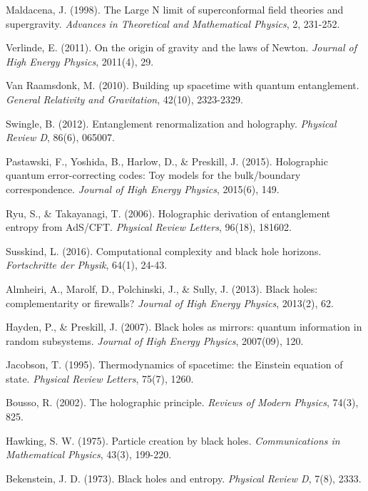 \documentclass[12pt,a4paper]{article}
\begin{document}
\begin{thebibliography}{99}

 Maldacena, J. (1998). The Large N limit of superconformal field theories and supergravity. \textit{Advances in Theoretical and Mathematical Physics}, 2, 231-252.

 Verlinde, E. (2011). On the origin of gravity and the laws of Newton. \textit{Journal of High Energy Physics}, 2011(4), 29.

 Van Raamsdonk, M. (2010). Building up spacetime with quantum entanglement. \textit{General Relativity and Gravitation}, 42(10), 2323-2329.

 Swingle, B. (2012). Entanglement renormalization and holography. \textit{Physical Review D}, 86(6), 065007.

 Pastawski, F., Yoshida, B., Harlow, D., \& Preskill, J. (2015). Holographic quantum error-correcting codes: Toy models for the bulk/boundary correspondence. \textit{Journal of High Energy Physics}, 2015(6), 149.

 Ryu, S., \& Takayanagi, T. (2006). Holographic derivation of entanglement entropy from AdS/CFT. \textit{Physical Review Letters}, 96(18), 181602.

 Susskind, L. (2016). Computational complexity and black hole horizons. \textit{Fortschritte der Physik}, 64(1), 24-43.

 Almheiri, A., Marolf, D., Polchinski, J., \& Sully, J. (2013). Black holes: complementarity or firewalls? \textit{Journal of High Energy Physics}, 2013(2), 62.

 Hayden, P., \& Preskill, J. (2007). Black holes as mirrors: quantum information in random subsystems. \textit{Journal of High Energy Physics}, 2007(09), 120.

 Jacobson, T. (1995). Thermodynamics of spacetime: the Einstein equation of state. \textit{Physical Review Letters}, 75(7), 1260.

 Bousso, R. (2002). The holographic principle. \textit{Reviews of Modern Physics}, 74(3), 825.

 Hawking, S. W. (1975). Particle creation by black holes. \textit{Communications in Mathematical Physics}, 43(3), 199-220.

 Bekenstein, J. D. (1973). Black holes and entropy. \textit{Physical Review D}, 7(8), 2333.


\end{thebibliography}
\end{document}
